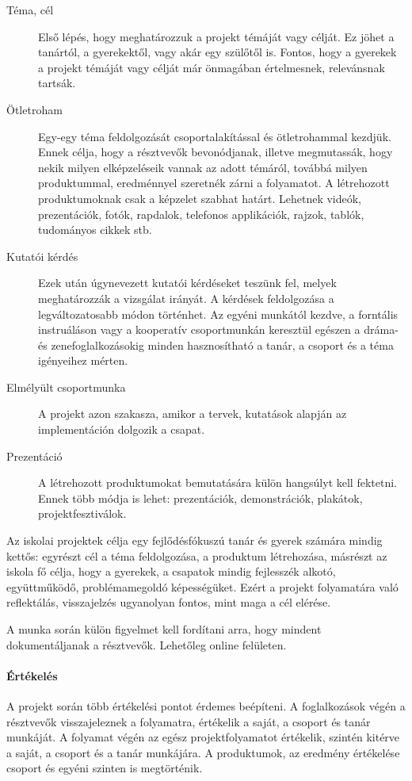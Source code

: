 \begin{description}
      \item[Téma, cél] Első lépés, hogy meghatározzuk a projekt témáját vagy
            célját. Ez jöhet a tanártól, a gyerekektől, vagy akár egy szülőtől is. Fontos, hogy a gyerekek a projekt témáját vagy célját már önmagában értelmesnek, relevánsnak tartsák.

      \item [Ötletroham]  Egy-egy téma feldolgozását csoportalakítással és
            ötletrohammal kezdjük. Ennek célja, hogy a résztvevők bevonódjanak, illetve megmutassák, hogy nekik milyen elképzeléseik vannak az adott témáról, továbbá milyen produktummal, eredménnyel szeretnék zárni a folyamatot. A létrehozott produktumoknak csak a képzelet szabhat határt. Lehetnek videók, prezentációk, fotók, rapdalok, telefonos applikációk, rajzok, tablók, tudományos cikkek stb. 

      \item [Kutatói kérdés] Ezek után úgynevezett kutatói kérdéseket teszünk
            fel, melyek meghatározzák a vizsgálat irányát. A kérdések feldolgozása a legváltozatosabb módon történhet. Az egyéni munkától kezdve, a forntális instruáláson vagy a kooperatív csoportmunkán keresztül egészen a dráma- és zenefoglalkozásokig minden hasznosítható a tanár, a csoport és a téma igényeihez mérten.
      \item [Elmélyült csoportmunka] A projekt azon szakasza, amikor a tervek,
            kutatások alapján az implementáción dolgozik a csapat.
      \item [Prezentáció] A létrehozott produktumokat bemutatására külön
            hangsúlyt kell fektetni. Ennek több módja is lehet: prezentációk, demonstrációk, plakátok, projektfesztiválok.
\end{description}

Az iskolai projektek célja egy fejlődésfókuszú tanár és gyerek számára mindig kettős: egyrészt cél a téma feldolgozása, a produktum létrehozása, másrészt az iskola fő célja, hogy a gyerekek, a csapatok mindig fejlesszék alkotó, együttműködő, problémamegoldó képességüket. Ezért a projekt folyamatára való reflektálás, visszajelzés ugyanolyan fontos, mint maga a cél elérése.

A munka során külön figyelmet kell fordítani arra, hogy mindent dokumentáljanak a résztvevők. Lehetőleg online felületen.

\paragraph{Értékelés} A projekt során több értékelési pontot érdemes beépíteni.
A foglalkozások végén a résztvevők visszajeleznek a folyamatra, értékelik a saját, a csoport és tanár munkáját. A folyamat végén az egész projektfolyamatot értékelik, szintén kitérve a saját, a csoport és a tanár munkájára. A produktumok, az eredmény értékelése csoport és egyéni szinten is megtörténik.

